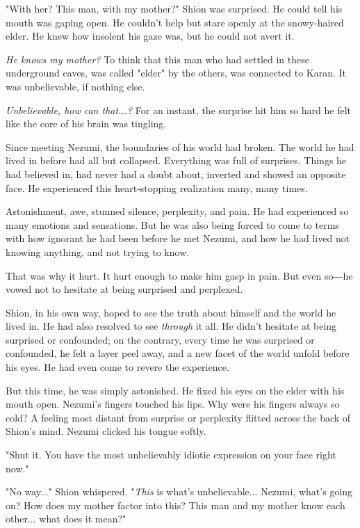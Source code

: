 "With her? This man, with my mother?" Shion was surprised. He could tell
his mouth was gaping open. He couldn't help but stare openly at the
snowy-haired elder. He knew how insolent his gaze was, but he could not
avert it.

\emph{He knows my mother?} To think that this man who had settled in these
underground caves, was called "elder" by the others, was connected to
Karan. It was unbelievable, if nothing else.

\emph{Unbelievable, how can that...?} For an instant, the surprise hit him so
hard he felt like the core of his brain was tingling.

Since meeting Nezumi, the boundaries of his world had broken. The world
he had lived in before had all but collapsed. Everything was full of
surprises. Things he had believed in, had never had a doubt about,
inverted and showed an opposite face. He experienced this heart-stopping
realization many, many times.

Astonishment, awe, stunned silence, perplexity, and pain. He had
experienced so many emotions and sensations. But he was also being
forced to come to terms with how ignorant he had been before he met
Nezumi, and how he had lived not knowing anything, and not trying to
know.

That was why it hurt. It hurt enough to make him gasp in pain. But even
so―he vowed not to hesitate at being surprised and perplexed.

Shion, in his own way, hoped to see the truth about himself and the
world he lived in. He had also resolved to see \emph{through} it all. He didn't
hesitate at being surprised or confounded; on the contrary, every time
he was surprised or confounded, he felt a layer peel away, and a new
facet of the world unfold before his eyes. He had even come to revere
the experience.

But this time, he was simply astonished. He fixed his eyes on the elder
with his mouth open. Nezumi's fingers touched his lips. Why were his
fingers always so cold? A feeling most distant from surprise or
perplexity flitted across the back of Shion's mind. Nezumi clicked his
tongue softly.

"Shut it. You have the most unbelievably idiotic expression on your face
right now."

"No way..." Shion whispered. "\emph{This} is what's unbelievable... Nezumi,
what's going on? How does my mother factor into this? This man and my
mother know each other... what does it mean?"

